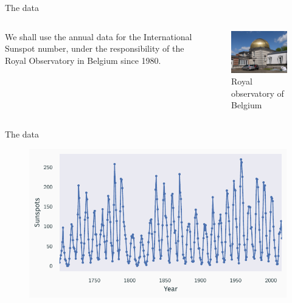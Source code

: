 \documentclass[aspectratio=169]{beamer}
\begin{document}
\begin{frame}{The data}
  \begin{columns}
    \begin{column}{0.5\textwidth}
      We shall use the annual data for the International Sunspot number,
      under the responsibility of the Royal Observatory in Belgium since 1980.
    \end{column}
    \begin{column}{0.5\textwidth}
      \vspace{1em}
      \begin{figure}
        \includegraphics[width=\textwidth]{belgium.JPG}
        \caption{Royal observatory of Belgium}
      \end{figure}
    \end{column}
  \end{columns}
\end{frame}

\begin{frame}{The data}
  \begin{figure}
    \centering
    \includegraphics{data.pdf}
  \end{figure}
\end{frame}
\end{document}
